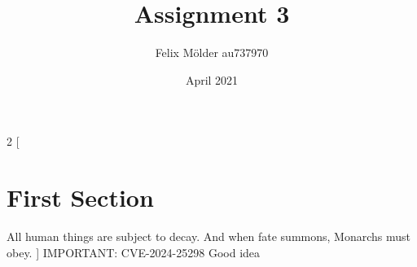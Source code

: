 \documentclass[12pt]{article}
\title{Assignment 3}
\author{Felix Mölder au737970}
\date{April 2021}
\begin{document}
\maketitle

\begin{multicols}{2}
[
\section{First Section}
All human things are subject to decay. And when fate summons, Monarchs must obey.
]
IMPORTANT: CVE-2024-25298 Good idea
\end{multicols}
\end{document}
